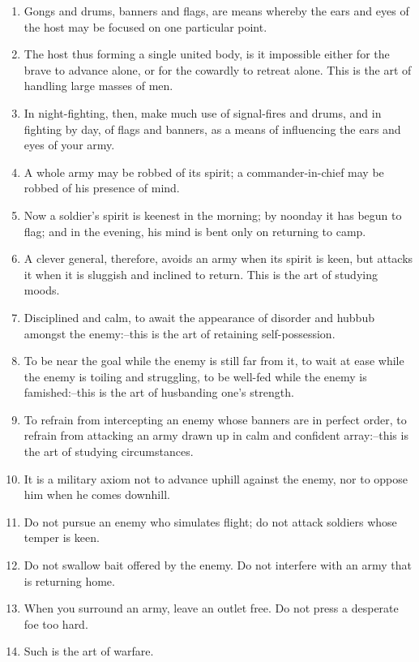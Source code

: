 \begin{enumerate}
  \item Gongs and drums, banners and flags, are means whereby the ears
    and eyes of the host may be focused on one particular point.

  \item The host thus forming a single united body, is it impossible
    either for the brave to advance alone, or for the cowardly to
    retreat alone. This is the art of handling large masses of men.

  \item In night-fighting, then, make much use of signal-fires and
    drums, and in fighting by day, of flags and banners, as a means of
    influencing the ears and eyes of your army.

  \item A whole army may be robbed of its spirit; a commander-in-chief
    may be robbed of his presence of mind.

  \item Now a soldier's spirit is keenest in the morning; by noonday
    it has begun to flag; and in the evening, his mind is bent only on
    returning to camp.

  \item A clever general, therefore, avoids an army when its spirit is
    keen, but attacks it when it is sluggish and inclined to return.
    This is the art of studying moods.

  \item Disciplined and calm, to await the appearance of disorder and
    hubbub amongst the enemy:--this is the art of retaining
    self-possession.

  \item To be near the goal while the enemy is still far from it, to
    wait at ease while the enemy is toiling and struggling, to be
    well-fed while the enemy is famished:--this is the art of
    husbanding one's strength.

  \item To refrain from intercepting an enemy whose banners are in
    perfect order, to refrain from attacking an army drawn up in calm
    and confident array:--this is the art of studying circumstances.

  \item It is a military axiom not to advance uphill against the
    enemy, nor to oppose him when he comes downhill.

  \item Do not pursue an enemy who simulates flight; do not attack
    soldiers whose temper is keen.

  \item Do not swallow bait offered by the enemy. Do not interfere
    with an army that is returning home.

  \item When you surround an army, leave an outlet free. Do not press
    a desperate foe too hard.

  \item Such is the art of warfare.

  \end{enumerate}
